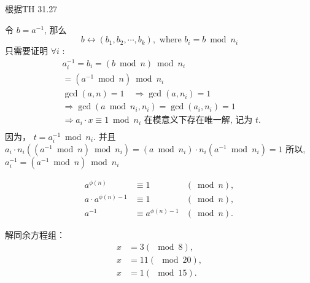 \documentclass[a4paper, justified]{tufte-handout}
\begin{document}
\begin{problem}[TC 31.5-3]
\end{problem}

\begin{solution}
	根据TH 31.27

	令 $b=a^{-1}$, 那么
	$$
		b \leftrightarrow\left(b_1, b_2, \cdots, b_k\right), \text { where } b_i=b \bmod n_i
	$$
	只需要证明 $\forall i$ :
	$$
		\begin{aligned}
			 & a_i^{-1}=b_i=(b \bmod n) \bmod n_i                                                                    \\
			 & =\left(a^{-1} \bmod n\right) \bmod n_i                                                                \\
			 & \operatorname{gcd}(a, n)=1 \quad \Rightarrow \operatorname{gcd}\left(a, n_i\right)=1                  \\
			 & \Rightarrow \operatorname{gcd}\left(a \bmod n_i, n_i\right)=\operatorname{gcd}\left(a_i, n_i\right)=1 \\
			 & \Rightarrow a_i \cdot x \equiv 1 \bmod n_i \text { 在模意义下存在唯一解, 记为 } t \text {. }          \\
			 &
		\end{aligned}
	$$
	因为， $t=a_i^{-1} \bmod n_i$. 并且
	$a_i \cdot n_i\left(\left(a^{-1} \bmod n\right) \bmod n_i\right)=\left(a \bmod n_i\right) \cdot n_i\left(a^{-1} \bmod n_i\right)=1$
	所以, $a_i^{-1}=\left(a^{-1} \bmod n\right) \bmod n_i$
\end{solution}

\begin{problem}[TC 31.6-3]
\end{problem}

\begin{solution}
	$$
		\begin{array}{rlr}
			a^{\phi(n)}           & \equiv 1             & (\bmod n),  \\
			a \cdot a^{\phi(n)-1} & \equiv 1             & (\bmod n),  \\
			a^{-1}                & \equiv a^{\phi(n)-1} & (\bmod n) .
		\end{array}
	$$
\end{solution}

\beginoptional

\begin{problem}[同余方程组]
解同余方程组：
$$\begin{array}{ll}
		x & = 3 (\mod 8),   \\
		x & = 11 (\mod 20), \\
		x & =1 (\mod 15).
	\end{array}
$$
\end{problem}
\end{document}
